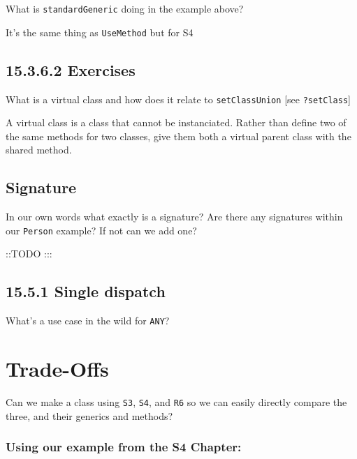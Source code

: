 \documentclass[]{book}
\begin{document}
What is \texttt{standardGeneric} doing in the example above?

It's the same thing as \texttt{UseMethod} but for S4

\hypertarget{exercises-14}{%
\section*{15.3.6.2 Exercises}\label{exercises-14}}

What is a virtual class and how does it relate to \texttt{setClassUnion} {[}see \texttt{?setClass}{]}

A virtual class is a class that cannot be instanciated. Rather than define two of the same methods for two classes, give them both a virtual parent class with the shared method.

\hypertarget{signature}{%
\section*{Signature}\label{signature}}

In our own words what exactly is a signature? Are there any signatures within our \texttt{Person} example? If not can we add one?

::TODO
:::

\hypertarget{single-dispatch}{%
\section*{15.5.1 Single dispatch}\label{single-dispatch}}

What's a use case in the wild for \texttt{ANY}?

\hypertarget{trade-offs}{%
\chapter{Trade-Offs}\label{trade-offs}}

Can we make a class using \texttt{S3}, \texttt{S4}, and \texttt{R6} so we can easily directly compare the three, and their generics and methods?

\hypertarget{using-our-example-from-the-s4-chapter}{%
\subsection{Using our example from the S4 Chapter:}\label{using-our-example-from-the-s4-chapter}}
\end{document}
